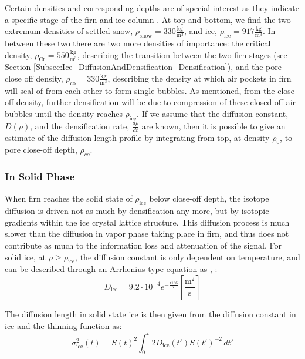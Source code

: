 \documentclass[../../CompleteThesis2/Complete_2ndDraft]{subfiles}
\begin{document}
Certain densities and corresponding depths are of special interest as they indicate a specific stage of the firn and ice column \cite{HerronLangway1980}. At top and bottom, we find the two extremum densities of settled snow, $\rho_{\text{snow}} = 330 \frac{\text{kg}}{\text{m}^3}$, and ice, $\rho_{\text{ice}} = 917 \frac{\text{kg}}{\text{m}^3}$. In between these two there are two more densities of importance: the critical density, $\rho_{\text{Cr}} = 550 \frac{\text{kg}}{\text{m}^3}$, describing the transition between the two firn stages (see Section \ref{Subsec:Ice_DiffusionAndDensification_Densification}), and the pore close off density, $\rho_{\text{co}} = 330 \frac{\text{kg}}{\text{m}^3}$, describing the density at which air pockets in firn will seal of from each other to form single bubbles. As mentioned, from the close-off density, further densification will be due to compression of these closed off air bubbles until the density reaches $\rho_{\text{ice}}$.
If we assume that the diffusion constant, $D(\rho)$, and the densification rate, $\frac{d\rho}{dt}$ are known, then it is possible to give an estimate of the diffusion length profile by integrating from top, at density $\rho_0$, to pore close-off depth, $\rho_{co}$.



\subsubsection{In Solid Phase}
\label{Subsubsec:Ice_DiffusionAndDensification_Diffusion_Ice}
When firn reaches the solid state of $\rho_{\text{ice}}$ below close-off depth, the isotope diffusion is driven not as much by densification any more, but by isotopic gradients within the ice crystal lattice structure. This diffusion process is much slower than the diffusion in vapor phase taking place in firn, and thus does not contribute as much to the information loss and attenuation of the signal. For solid ice, at $\rho \geq \rho_{\text{ice}}$, the diffusion constant is only dependent on temperature, and can be described through an Arrhenius type equation as \cite[Ramseier, 1967]{Ramsier1967}, \cite[Johnsen et al., 2000]{Johnsen2000}:
\begin{equation}
	D_{\text{ice}} = 9.2 \cdot 10^{-4} e^{-\frac{7186}{T}} 	\left[\frac{\text{m}^2}{\text{s}}\right]
	\label{Eq:Ice_Diff_const}
\end{equation}

The diffusion length in solid state ice is then given from the diffusion constant in ice and the thinning function as:
\begin{equation}
	\sigma^2_{\text{ice}}(t) = S(t)^2 \int_{0}^{t}2 D_{\text{ice}}(t') S(t')^{-2} \, dt'
	\label{Eq:Diff_Len_Ice}
\end{equation}
\end{document}
